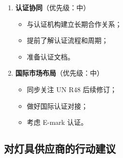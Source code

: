 \begin{enumerate}[leftmargin=2em]
    \item \textbf{认证协同}（优先级：中）
    \begin{itemize}[leftmargin=2em]
        \item 与认证机构建立长期合作关系；
        \item 提前了解认证流程和周期；
        \item 准备认证文档。
    \end{itemize}

    \item \textbf{国际市场布局}（优先级：中）
    \begin{itemize}[leftmargin=2em]
        \item 同步关注 UN R48 后续修订；
        \item 做好国际认证对接；
        \item 考虑 E-mark 认证。
    \end{itemize}
\end{enumerate}

\subsection{对灯具供应商的行动建议}

